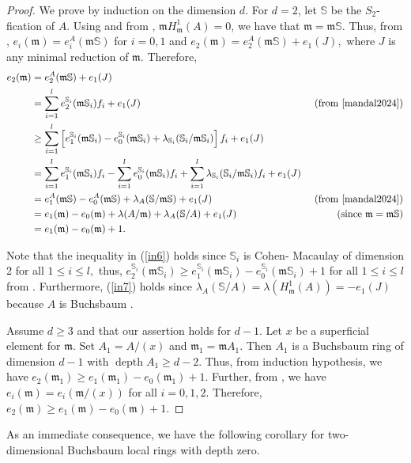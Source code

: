 \documentclass[11pt]{amsart}
\theoremstyle{plain}
\newcommand{\m}{\mathfrak{m}}
\newcommand{\depth}{\operatorname{depth}}
\theoremstyle{plain}
\begin{document}
\begin{proof}
  We prove by induction on the dimension $d.$ For $d=2$,  let $\mathbb{S}$ be the $S_{2}$-fication of $A.$  Using \cite[Proposition 4.1]{GHEZZI_GOTO_HONG_VASCONCELOS_2017}  and  from \cite[Chapter 2, Proposition 2.1$(iii)$]{stückrad2014buchsbaum}, $\mathfrak{m} H
    ^{1}_{\mathfrak{m}}(A) = 0$, we have that $\mathfrak m =\mathfrak m\mathbb S.$ Thus, from \cite[Lemma 4.4]{mandal2024}, $e_{i}(\m)=e_{i}^{A}(\m\mathbb S)$ for $i=0,1$ and $e_{2}(\m)=e_{2}^{A}(\m \mathbb S)+e_{1}(J),$ where $J$ is any minimal reduction of $\m.$ Therefore,
    \begin{align}
        \nonumber
        e_{2}(\m)&=e_{2}^{A}(\m \mathbb S)+e_{1}(J)\\ \nonumber
        &=\sum_{i=1}^{l}e_{2}^{\mathbb S_{i}}(\m \mathbb S_{i})f_{i}+e_{1}(J) & \text{ (from \cite[Lemma 4.2$(iii)$]{mandal2024})}\\ \label{in6}
        &\geq \sum_{i=1}^{l}\left[e_{1}^{\mathbb S_{i}}(\m \mathbb S_{i})-e_{0}^{\mathbb S_{i}}(\m \mathbb S_{i})+\lambda_{\mathbb S_{i}}(\mathbb S_{i}/\m \mathbb S_{i})\right]f_{i}+e_{1}(J)\\ \nonumber
        &=\sum_{i=1}^{l}e_{1}^{\mathbb S_{i}}(\m \mathbb S_{i})f_{i}-\sum_{i=1}^{l}e_{0}^{\mathbb S_{i}}(\m \mathbb S_{i})f_{i}+\sum_{i=1}^{l}\lambda_{\mathbb S_{i}}(\mathbb S_{i}/\m \mathbb S_{i})f_{i}+e_{1}(J)\\ \nonumber
        &=e_{1}^{A}(\m \mathbb S)-e_{0}^{A}(\m \mathbb S)+\lambda_{A}(\mathbb S/\m \mathbb S)+e_{1}(J) & \text{ (from \cite[Lemma 4.2$(i)$ and $(ii)$]{mandal2024})}\\ \nonumber
        &=e_{1}(\m)-e_{0}(\m)+\lambda(A/\m )+\lambda_{A}(\mathbb S/A)+e_{1}(J)& \text{ (since $\m=\m \mathbb S $)}\\  \label{in7}
        &=e_{1}(\m)-e_{0}(\m)+1.
    \end{align}

    


     Note that the inequality in (\ref{in6})  holds since  $\mathbb S_{i}$ is Cohen- Macaulay of dimension 2 for all $1 \leq i \leq l,$ thus,  $e_{2}^{\mathbb S_{i}}(\m \mathbb S_{i})\geq e_{1}^{\mathbb S_{i}}(\m \mathbb S_{i})-e_{0}^{\mathbb S_{i}}(\m \mathbb S_{i})+1$ for all $1 \leq i \leq l$ from \cite{itoh1}. Furthermore, (\ref{in7}) holds since  $\lambda_{A}(\mathbb S/A)=\lambda\left(H^{1}_{\mathfrak m}(A)\right)=-e_{1}(J)$ because $A$ is Buchsbaum \cite[
         Chapter 1, Propositions 2.6 and 2.7]{stückrad2014buchsbaum}.


      
      Assume $d \geq 3$ and that our assertion holds for $d-1.$  Let $x$ be a superficial element for $\m.$ Set $A_{1}=A/(x)$ and $\m_{1}=\m A_{1}.$ Then $A_{1}$ is a Buchsbaum ring of dimension $d-1$ with $\depth A_{1} \geq d-2.$ Thus, from induction hypothesis, we have $e_{2}(\m_{1})\geq e_{1}(\m_{1})-e_{0}(\m_{1})+1.$ Further, from \cite[Proposition 1.2]{rossi2010hilbert}, we have $e_{i}(\m)=e_{i}(\m/(x))$ for all $i=0,1,2$. Therefore, $e_{2}(\m)\geq e_{1}(\m)-e_{0}(\m)+1.$
\end{proof}
 As an immediate consequence, we have the following corollary for two-dimensional Buchsbaum local rings with depth zero.  
 
\end{document}
